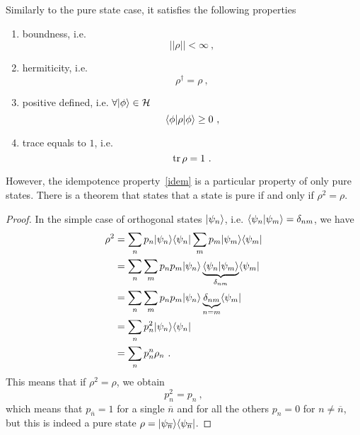     Similarly to the pure state case, it satisfies the following properties
    \begin{enumerate}
        \item boundness, i.e. 
            \begin{equation*}
                ||\rho|| < \infty~,
            \end{equation*}
        \item hermiticity, i.e. 
            \begin{equation*}
                \rho^\dagger = \rho ~,
            \end{equation*}
        \item positive defined, i.e. $\forall \vert\phi\rangle \in \mathcal H$
            \begin{equation*}
                \langle\phi\vert \rho \vert\phi\rangle \geq 0 ~,
            \end{equation*}
        \item trace equals to $1$, i.e. 
            \begin{equation*}
                \operatorname{tr} \rho = 1 ~.
            \end{equation*}
    \end{enumerate}
    However, the idempotence property~\eqref{idem} is a particular property of only pure states. There is a theorem that states that a state is pure if and only if $\rho^2 = \rho$.
    \begin{proof}
        In the simple case of orthogonal states $\vert\psi_n\rangle$, i.e. $\langle\psi_n\vert\psi_m\rangle = \delta_{nm}$, we have 
        \begin{equation*}
        \begin{aligned}
            \rho^2 & = \sum_n p_n \vert\psi_n\rangle \langle\psi_n\vert \sum_m p_m \vert\psi_m\rangle \langle\psi_m\vert \\ & = \sum_n \sum_m p_n p_m \vert\psi_n\rangle \underbrace{\langle\psi_n\vert\psi_m\rangle}_{\delta_{nm}} \langle\psi_m\vert \\ & = \sum_n \sum_m p_n p_m \vert\psi_n\rangle \underbrace{\delta_{nm}}_{n=m} \langle\psi_m\vert \\ & = \sum_n p^2_n \vert\psi_n\rangle \langle\psi_n\vert \\ & = \sum_n p^n_n \rho_n ~.
        \end{aligned}
        \end{equation*}
        This means that if $\rho^2 = \rho$, we obtain 
        \begin{equation*}
            p_n^2 = p_n ~,
        \end{equation*}
        which means that $p_{\overline n} = 1$ for a single $\overline n$ and for all the others $p_n = 0$ for $n \neq \overline n$, but this is indeed a pure state $\rho = \vert\psi_{\overline n}\rangle \langle\psi_{\overline n}\vert$.
    \end{proof}

